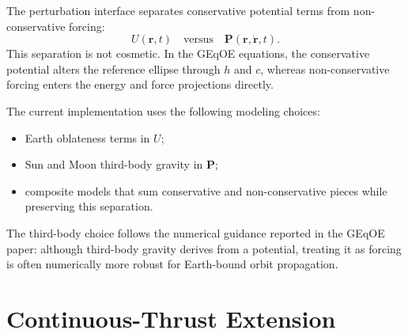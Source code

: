 \documentclass[11pt]{article}
\begin{document}
The perturbation interface separates conservative potential terms from
non-conservative forcing:
\begin{equation}
U(\bm{r},t) \quad \text{versus} \quad \bm{P}(\bm{r},\dot{\bm{r}},t).
\end{equation}
This separation is not cosmetic. In the GEqOE equations, the conservative
potential alters the reference ellipse through $h$ and $c$, whereas
non-conservative forcing enters the energy and force projections directly.

The current implementation uses the following modeling choices:
\begin{itemize}
    \item Earth oblateness terms in $U$;
    \item Sun and Moon third-body gravity in $\bm{P}$;
    \item composite models that sum conservative and non-conservative pieces
    while preserving this separation.
\end{itemize}

The third-body choice follows the numerical guidance reported in the GEqOE
paper: although third-body gravity derives from a potential, treating it as
forcing is often numerically more robust for Earth-bound orbit propagation.

\section{Continuous-Thrust Extension}
\end{document}
